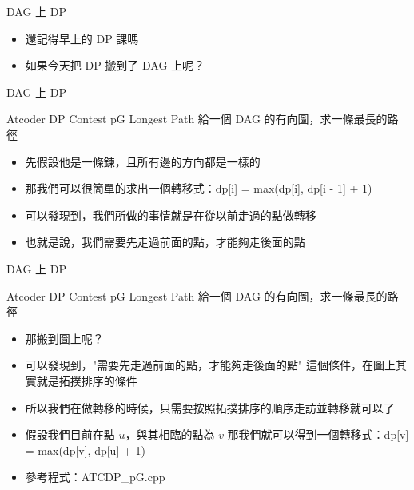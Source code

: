 \documentclass[aspectratio=169]{beamer}
\begin{document}
    \begin{frame}{DAG 上 DP}
        \begin{itemize}
            \item 還記得早上的 DP 課嗎
            \item 如果今天把 DP 搬到了 DAG 上呢？
        \end{itemize}
    \end{frame}

    \begin{frame}{DAG 上 DP}
        \begin{block}{Atcoder DP Contest pG Longest Path}
            給一個 DAG 的有向圖，求一條最長的路徑
        \end{block}

        \begin{itemize}
            \item<2-> 先假設他是一條鍊，且所有邊的方向都是一樣的
            \item<3-> 那我們可以很簡單的求出一個轉移式：dp[i] = max(dp[i], dp[i - 1] + 1)
            \item<4-> 可以發現到，我們所做的事情就是在從以前走過的點做轉移
            \item<4-> 也就是說，我們需要先走過前面的點，才能夠走後面的點
        \end{itemize}
    \end{frame}

    \begin{frame}{DAG 上 DP}
        \begin{block}{Atcoder DP Contest pG Longest Path}
            給一個 DAG 的有向圖，求一條最長的路徑
        \end{block}

        \begin{itemize}
            \item<1-> 那搬到圖上呢？
            \item<2-> 可以發現到，"需要先走過前面的點，才能夠走後面的點" 這個條件，在圖上其實就是拓撲排序的條件
            \item<3-> 所以我們在做轉移的時候，只需要按照拓撲排序的順序走訪並轉移就可以了
            \item<4-> 假設我們目前在點 $u$，與其相臨的點為 $v$ 那我們就可以得到一個轉移式：dp[v] = max(dp[v], dp[u] + 1)
            \item<4-> 參考程式：ATCDP\_pG.cpp
        \end{itemize}
    \end{frame}
\end{document}
